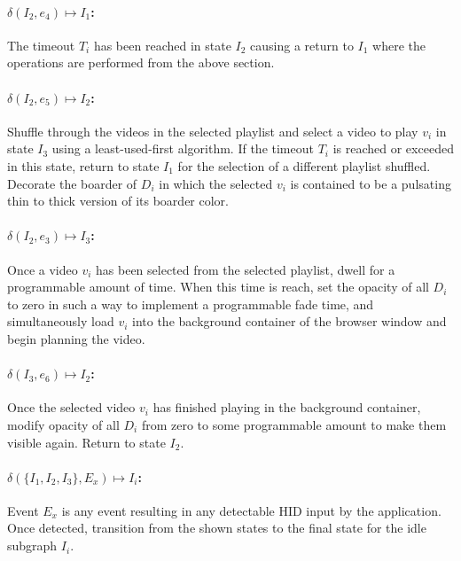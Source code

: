 \documentclass[10pt]{article}
\begin{document}
\paragraph{$\delta(I_{2}, e_{4}) \mapsto I_{1}$:}

The timeout $T_{i}$ has been reached in state $I_{2}$ causing a return to $I_{1}$ where the operations are performed from the above section.

\paragraph{$\delta(I_{2}, e_{5}) \mapsto I_{2}$:}

Shuffle through the videos in the selected playlist and select a video to play $v_{i}$ in state $I_{3}$ using a least-used-first algorithm. If the timeout $T_{i}$ is reached or exceeded in this state, return to state $I_{1}$ for the selection of a different playlist shuffled. Decorate the boarder of $D_{i}$ in which the selected $v_{i}$ is contained to be a pulsating thin to thick version of its boarder color. 

\paragraph{$\delta(I_{2}, e_{3}) \mapsto I_{3}$:}

Once a video $v_{i}$ has been selected from the selected playlist, dwell for a programmable amount of time. When this time is reach, set the opacity of all $D_{i}$ to zero in such a way to implement a programmable fade time, and simultaneously load $v_{i}$ into the background container of the browser window and begin planning the video. 

\paragraph{$\delta(I_{3}, e_{6}) \mapsto I_{2}$:}

Once the selected video $v_{i}$ has finished playing in the background container, modify opacity of all $D_{i}$ from zero to some programmable amount to make them visible again. Return to state $I_{2}$.

\paragraph{$\delta(\{I_{1}, I_{2}, I_{3}\}, E_{x}) \mapsto I_{i}$:}

Event $E_{x}$ is any event resulting in any detectable HID input by the application. Once detected, transition from the shown states to the final state for the idle subgraph $I_{i}$.
\end{document}
